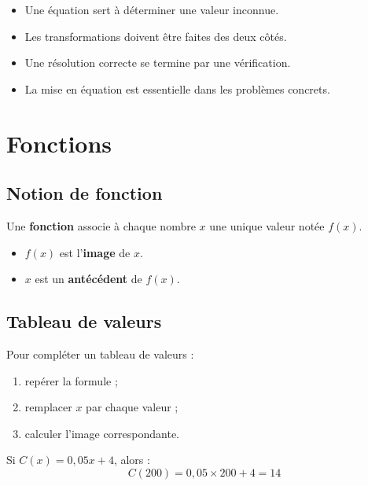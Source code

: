 \documentclass[11pt,a4paper,twoside]{book}
\begin{document}
\begin{retenirbox}
\begin{itemize}
\item Une équation sert à déterminer une valeur inconnue.
\item Les transformations doivent être faites des deux côtés.
\item Une résolution correcte se termine par une vérification.
\item La mise en équation est essentielle dans les problèmes concrets.
\end{itemize}
\end{retenirbox}

\chapter{Fonctions}

\section{Notion de fonction}
\begin{definitionbox}
Une \textbf{fonction} associe à chaque nombre \(x\) une unique valeur notée \(f(x)\).
\end{definitionbox}

\begin{definitionbox}
\begin{itemize}
\item \(f(x)\) est l'\textbf{image} de \(x\).
\item \(x\) est un \textbf{antécédent} de \(f(x)\).
\end{itemize}
\end{definitionbox}

\section{Tableau de valeurs}
\begin{methodebox}
Pour compléter un tableau de valeurs :
\begin{enumerate}
\item repérer la formule ;
\item remplacer \(x\) par chaque valeur ;
\item calculer l'image correspondante.
\end{enumerate}
\end{methodebox}

\begin{exemplebox}
Si \(C(x)=0{,}05x+4\), alors :
\[
C(200)=0{,}05\times 200+4=14
\]
\end{exemplebox}
\end{document}
